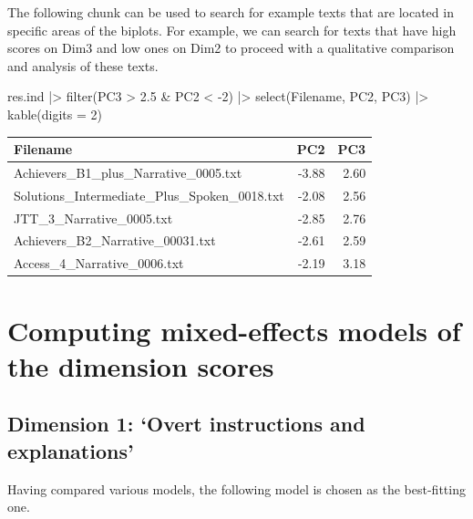 \documentclass[
  letterpaper,
  DIV=11,
  numbers=noendperiod]{scrreprt}
\newenvironment{Shaded}{\begin{snugshade}}{\end{snugshade}}
\newcommand{\AttributeTok}[1]{\textcolor[rgb]{0.40,0.45,0.13}{#1}}
\newcommand{\DecValTok}[1]{\textcolor[rgb]{0.68,0.00,0.00}{#1}}
\newcommand{\FloatTok}[1]{\textcolor[rgb]{0.68,0.00,0.00}{#1}}
\newcommand{\FunctionTok}[1]{\textcolor[rgb]{0.28,0.35,0.67}{#1}}
\newcommand{\NormalTok}[1]{\textcolor[rgb]{0.00,0.23,0.31}{#1}}
\newcommand{\SpecialCharTok}[1]{\textcolor[rgb]{0.37,0.37,0.37}{#1}}
\begin{document}
The following chunk can be used to search for example texts that are
located in specific areas of the biplots. For example, we can search for
texts that have high scores on Dim3 and low ones on Dim2 to proceed with
a qualitative comparison and analysis of these texts.

\begin{Shaded}
\begin{Highlighting}[]
\NormalTok{res.ind }\SpecialCharTok{|\textgreater{}} 
  \FunctionTok{filter}\NormalTok{(PC3 }\SpecialCharTok{\textgreater{}} \FloatTok{2.5} \SpecialCharTok{\&}\NormalTok{ PC2 }\SpecialCharTok{\textless{}} \SpecialCharTok{{-}}\DecValTok{2}\NormalTok{) }\SpecialCharTok{|\textgreater{}} 
  \FunctionTok{select}\NormalTok{(Filename, PC2, PC3) }\SpecialCharTok{|\textgreater{}} 
  \FunctionTok{kable}\NormalTok{(}\AttributeTok{digits =} \DecValTok{2}\NormalTok{)}
\end{Highlighting}
\end{Shaded}

\begin{longtable}[]{@{}lrr@{}}
\toprule\noalign{}
Filename & PC2 & PC3 \\
\midrule\noalign{}
\endhead
\bottomrule\noalign{}
\endlastfoot
Achievers\_B1\_plus\_Narrative\_0005.txt & -3.88 & 2.60 \\
Solutions\_Intermediate\_Plus\_Spoken\_0018.txt & -2.08 & 2.56 \\
JTT\_3\_Narrative\_0005.txt & -2.85 & 2.76 \\
Achievers\_B2\_Narrative\_00031.txt & -2.61 & 2.59 \\
Access\_4\_Narrative\_0006.txt & -2.19 & 3.18 \\
\end{longtable}

\section{Computing mixed-effects models of the dimension
scores}\label{computing-mixed-effects-models-of-the-dimension-scores}

\subsection{Dimension 1: `Overt instructions and
explanations'}\label{dimension-1-overt-instructions-and-explanations}

Having compared various models, the following model is chosen as the
best-fitting one.
\end{document}
